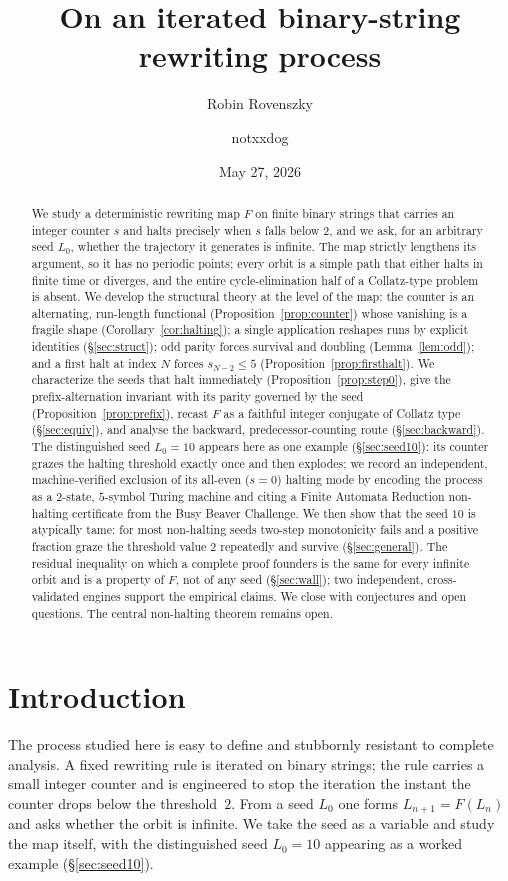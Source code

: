 \documentclass[11pt,reqno]{amsart}
\title[An iterated binary-string rewriting process]{On an iterated binary-string rewriting process}
\author{Robin Rovenszky}
\author{notxxdog}
\date{May 27, 2026}
\theoremstyle{plain}
\theoremstyle{definition}
\theoremstyle{remark}
\begin{document}
\begin{abstract}
We study a deterministic rewriting map $F$ on finite binary strings that carries an integer counter $s$ and halts precisely when $s$ falls below $2$, and we ask, for an arbitrary seed $L_0$, whether the trajectory it generates is infinite.  The map strictly lengthens its argument, so it has no periodic points; every orbit is a simple path that either halts in finite time or diverges, and the entire cycle-elimination half of a Collatz-type problem is absent.  We develop the structural theory at the level of the map: the counter is an alternating, run-length functional (Proposition~\ref{prop:counter}) whose vanishing is a fragile shape (Corollary~\ref{cor:halting}); a single application reshapes runs by explicit identities (\S\ref{sec:struct}); odd parity forces survival and doubling (Lemma~\ref{lem:odd}); and a first halt at index $N$ forces $s_{N-2}\le 5$ (Proposition~\ref{prop:firsthalt}).  We characterize the seeds that halt immediately (Proposition~\ref{prop:step0}), give the prefix-alternation invariant with its parity governed by the seed (Proposition~\ref{prop:prefix}), recast $F$ as a faithful integer conjugate of Collatz type (\S\ref{sec:equiv}), and analyse the backward, predecessor-counting route (\S\ref{sec:backward}).  The distinguished seed $L_0=10$ appears here as one example (\S\ref{sec:seed10}): its counter grazes the halting threshold exactly once and then explodes; we record an independent, machine-verified exclusion of its all-even ($s=0$) halting mode by encoding the process as a $2$-state, $5$-symbol Turing machine and citing a Finite Automata Reduction non-halting certificate from the Busy Beaver Challenge.  We then show that the seed $10$ is atypically tame: for most non-halting seeds two-step monotonicity fails and a positive fraction graze the threshold value $2$ repeatedly and survive (\S\ref{sec:general}).  The residual inequality on which a complete proof founders is the same for every infinite orbit and is a property of $F$, not of any seed (\S\ref{sec:wall}); two independent, cross-validated engines support the empirical claims.  We close with conjectures and open questions.  The central non-halting theorem remains open.
\end{abstract}

\maketitle
\tableofcontents

\section{Introduction}\label{sec:intro}
The process studied here is easy to define and stubbornly resistant to complete analysis. A fixed rewriting rule is iterated on binary strings; the rule carries a small integer counter and is engineered to stop the iteration the instant the counter drops below the threshold~$2$. From a seed $L_0$ one forms $L_{n+1}=F(L_n)$ and asks whether the orbit is infinite. We take the seed as a variable and study the map itself, with the distinguished seed $L_0=10$ appearing as a worked example (\S\ref{sec:seed10}).
\end{document}
